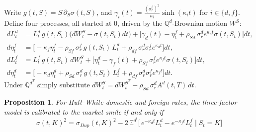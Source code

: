 \documentclass[11pt,a4paper]{article}
\theoremstyle{plain}
\newtheorem{prop}{Proposition}
\theoremstyle{remark}
\newcommand{\E}{\mathbb{E}}
\newcommand{\Q}{\mathbb{Q}}
\newcommand{\sgd}{\sigma^d_r}
\newcommand{\sgf}{\sigma^f_r}
\newcommand{\Ld}{L^{d}}
\newcommand{\Lf}{L^{f}}
\begin{document}
Write $g(t,S)=S\,\partial_S\sigma(t,S)$, and
$\gamma_i(t)=\frac{(\sigma^i_r)^2}{\kappa_i}\sinh(\kappa_it)$ for $i\in\{d,f\}$.
Define four processes, all started at $0$, driven by the $\Q^d$-Brownian
motion $W^S$:
\begin{align}
d\Ld_t &= \Ld_t\,g(t,S_t)\big(dW^S_t-\sigma(t,S_t)dt\big)
 +\big[\gamma_d(t)-\eta^f_t+\rho_{Sd}\,\sgd e^{\kappa_dt}\sigma(t,S_t)\big]dt, \label{eq:Ld}\\
d\eta^f_t &= \big[-\kappa_f\eta^f_t-\rho_{Sf}\,\sgf\,g(t,S_t)\,\Ld_t
 +\rho_{df}\,\sgd\sgf e^{\kappa_dt}\big]dt, \label{eq:etaf}\\[4pt]
d\Lf_t &= \Lf_t\,g(t,S_t)\,dW^S_t
 +\big[\eta^d_t-\gamma_f(t)+\rho_{Sf}\,\sgf e^{\kappa_ft}\sigma(t,S_t)\big]dt, \label{eq:Lf}\\
d\eta^d_t &= \big[-\kappa_d\eta^d_t+\rho_{Sd}\,\sgd\,g(t,S_t)\,\Lf_t
 +\rho_{df}\,\sgd\sgf e^{\kappa_ft}\big]dt. \label{eq:etad}
\end{align}
Under $\Q^{d^T}$ simply substitute
$dW^S_t=dW^{S^T}_t-\rho_{Sd}\,\sgd A^d(t,T)\,dt$.

\begin{prop}
For Hull--White domestic and foreign rates, the three-factor model is
calibrated to the market smile if and only if
\begin{equation}\label{eq:main}
\boxed{\;
\sigma(t,K)^2=\sigma_{Dup}(t,K)^2
-2\,\E^{d^t}\!\big[\,e^{-\kappa_dt}\Ld_t-e^{-\kappa_ft}\Lf_t\;\big|\;S_t=K\big]
\;}
\end{equation}
\end{prop}
\end{document}
